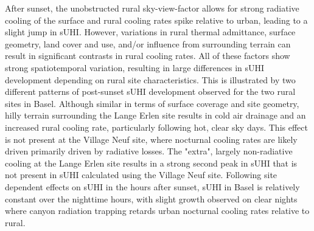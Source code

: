 \begin{bibunit}
After sunset, the unobstructed rural sky-view-factor allows for strong radiative cooling of the surface and rural cooling rates spike relative to urban, leading to a slight jump in sUHI. However, variations in rural thermal admittance, surface geometry, land cover and use, and/or influence from surrounding terrain can result in significant contrasts in rural cooling rates. All of these factors show strong spatiotemporal variation, resulting in large differences in sUHI development depending on rural site characteristics. This is illustrated by two different patterns of post-sunset sUHI development observed for the two rural sites in Basel. Although similar in terms of surface coverage and site geometry, hilly terrain surrounding the Lange Erlen site results in cold air drainage and an increased rural cooling rate, particularly following hot, clear sky days. This effect is not present at the Village Neuf site, where nocturnal cooling rates are likely driven primarily driven by radiative losses. The "extra", largely non-radiative cooling at the Lange Erlen site results in a strong second peak in sUHI that is not present in sUHI calculated using the Village Neuf site. Following site dependent effects on sUHI in the hours after sunset, sUHI in Basel is relatively constant over the nighttime hours, with slight growth observed on clear nights where canyon radiation trapping retards urban nocturnal cooling rates relative to rural. 




\end{bibunit}
